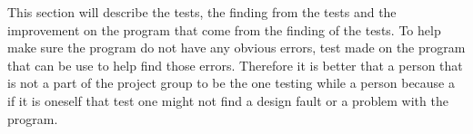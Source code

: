 This section will describe the tests, the finding from the tests and the improvement on the program that come from the finding of the tests. To help make sure the program do not have any obvious errors, test made on the program that can be use to help find those errors. Therefore it is better that a person that is not a part of the project group to be the one testing while a person because a if it is oneself that test one might not find a design fault or a problem with the program.